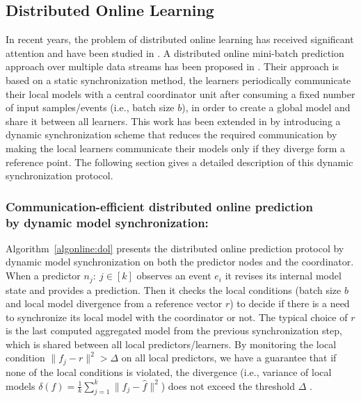 
\subsection{Distributed Online Learning}
In recent years, the problem of distributed online learning has received significant attention and have been studied in \cite{langford2009slow,yan2013distributed,xiao2010dual,dekel2012optimal,kamp2014communication}.  A distributed online mini-batch prediction approach over multiple data streams has been proposed in \cite{dekel2012optimal}. Their approach is based on a static synchronization method,  the learners periodically communicate  their local models with a central coordinator unit after consuming a fixed number of input samples/events (i.e., batch size $b$), in order to  create a global model and share it between all learners. This work has been extended in \cite{kamp2014communication} by introducing a
dynamic synchronization scheme that reduces the required communication by making the local learners communicate their models only if they diverge form a reference point. The following section gives a detailed description of this dynamic synchronization protocol.
\subsubsection*{Communication-efficient distributed online prediction\\ by dynamic model synchronization:\\}

\par Algorithm~\ref{algonline:dol} presents the distributed online prediction protocol by dynamic model synchronization on both the predictor nodes and the coordinator. When a predictor $n_j:\ j \in[k]$ observes an event $e_i$ it revises its internal model state and provides a prediction. Then it checks the local conditions  (batch size $b$ and local model divergence from a reference vector $r$) to decide if there is a need to synchronize its local model with the coordinator or not. The typical choice of $r$ is the last computed aggregated model from the previous synchronization step, which is shared between all local predictors/learners. By monitoring the local condition $\|f_j - r\|^2 > \Delta$ on all local predictors, we have a guarantee that if none of the local conditions is violated, the divergence (i.e., variance of local models $\delta(f)=\frac{1}{k} \sum_{j=1}^{k}\|f_j - \hat{f}\|^2$) does not exceed the threshold $\Delta$ \cite{kamp2014communication}. 



